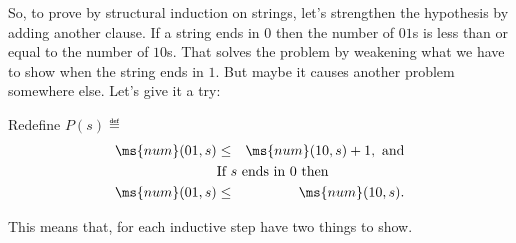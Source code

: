 \begin{definition}
\begin{staffnotes}
So, to prove by structural induction on strings, let's strengthen the
hypothesis by adding another clause.  If a string ends in $0$ then
the number of $01$s is less than or equal to the number of $10$s.
That solves the problem by weakening what we have to show when the
string ends in $1$.  But maybe it causes another problem somewhere
else.  Let's give it a try:

Redefine $P(s) \eqdef$
\begin{eqnarray*}
\ms{num}(01,s) & \leq & \ms{num}(10,s) + 1, \text{ and}\\
\lefteqn{\text{If $s$ ends in $0$ then}}\\
\ms{num}(01,s) & \leq  &\ms{num}(10,s).
\end{eqnarray*} 
 
This means that, for each inductive step have two things to show.
\iffalse

\structuredproof{

  Prove: $\forall s \in S \; (P(s))$ \\
  1. (Base) $P(\emptystring)$ 
  \reason{No patterns of either kind.} \\
  2. (Inductive step) $\forall s \in S \; (P(s) \implies P(s 0))$ \\
  1. Fix $s$. \\
  2. Assume $P(s)$. \\
  3. $P(s 0)$ \\
  1. $\ms{num}(01,s0) \leq \ms{num}(10,s0) + 1$. 
  \reason{???} \\
  2. If $s 0$ ends in $0$ then $\ms{num}(01,s0) \leq
  \ms{num}(10,s0)$. \noreason \\
  \reason{???} \\
  3. QED
  \reason{Conjunction} \\
  4. QED 
  \reason{Implication, UG} \\
  3. (Inductive step) $\forall s \in S \; (P(s) \implies P(s 1))$ \\
  1. Fix $s$. \\
  2. Assume $P(s)$. \\
  3. $P(s 1)$ \\
  1. $\ms{num}(01,s1) \leq \ms{num}(10,s1) + 1$. 
  \reason{???} \\
  2. If $s 1$ ends in $0$ then $\ms{num}(01,s1) \leq
  \ms{num}(10,s1)$.\noreason \\
  \reason{???} \\
  3. QED
  \reason{Conjunction} \\
  4. QED 
  \reason{Implication, UG} \\
  4. QED
  \reason{Structural induction on strings.}\\
}\fi


\end{staffnotes}
\end{definition}
